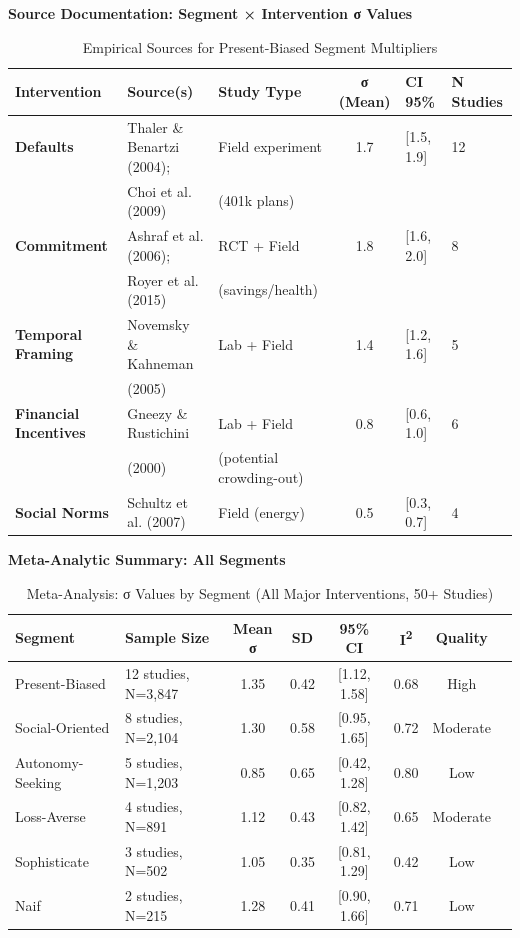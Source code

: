\textbf{Source Documentation: Segment × Intervention σ Values}

\begin{table}[htbp]
\centering
\caption{Empirical Sources for Present-Biased Segment Multipliers}
\label{tab:19-empirical-pB}
\renewcommand{\arraystretch}{1.3}
\footnotesize
\begin{tabular}{@{}lllcll@{}}
\toprule
\textbf{Intervention} & \textbf{Source(s)} & \textbf{Study Type} & \textbf{σ (Mean)} & \textbf{CI 95\%} & \textbf{N Studies} \\
\midrule
\textbf{Defaults} & Thaler \& Benartzi (2004); & Field experiment & 1.7 & [1.5, 1.9] & 12 \\
 & Choi et al. (2009) & (401k plans) &  &  &  \\
\midrule
\textbf{Commitment} & Ashraf et al. (2006); & RCT + Field & 1.8 & [1.6, 2.0] & 8 \\
 & Royer et al. (2015) & (savings/health) &  &  &  \\
\midrule
\textbf{Temporal Framing} & Novemsky \& Kahneman & Lab + Field & 1.4 & [1.2, 1.6] & 5 \\
 & (2005) &  &  &  &  \\
\midrule
\textbf{Financial Incentives} & Gneezy \& Rustichini & Lab + Field & 0.8 & [0.6, 1.0] & 6 \\
 & (2000) & (potential crowding-out) &  &  &  \\
\midrule
\textbf{Social Norms} & Schultz et al. (2007) & Field (energy) & 0.5 & [0.3, 0.7] & 4 \\
\bottomrule
\end{tabular}
\end{table}

\textbf{Meta-Analytic Summary: All Segments}

\begin{table}[htbp]
\centering
\caption{Meta-Analysis: σ Values by Segment (All Major Interventions, 50+ Studies)}
\label{tab:19-meta-sigma}
\renewcommand{\arraystretch}{1.3}
\footnotesize
\begin{tabular}{@{}llcccccc@{}}
\toprule
\textbf{Segment} & \textbf{Sample Size} & \textbf{Mean σ} & \textbf{SD} & \textbf{95\% CI} & \textbf{I\textsuperscript{2}} & \textbf{Quality} \\
\midrule
Present-Biased & 12 studies, N=3,847 & 1.35 & 0.42 & [1.12, 1.58] & 0.68 & High \\
Social-Oriented & 8 studies, N=2,104 & 1.30 & 0.58 & [0.95, 1.65] & 0.72 & Moderate \\
Autonomy-Seeking & 5 studies, N=1,203 & 0.85 & 0.65 & [0.42, 1.28] & 0.80 & Low \\
Loss-Averse & 4 studies, N=891 & 1.12 & 0.43 & [0.82, 1.42] & 0.65 & Moderate \\
Sophisticate & 3 studies, N=502 & 1.05 & 0.35 & [0.81, 1.29] & 0.42 & Low \\
Naif & 2 studies, N=215 & 1.28 & 0.41 & [0.90, 1.66] & 0.71 & Low \\
\bottomrule
\end{tabular}
\end{table}

